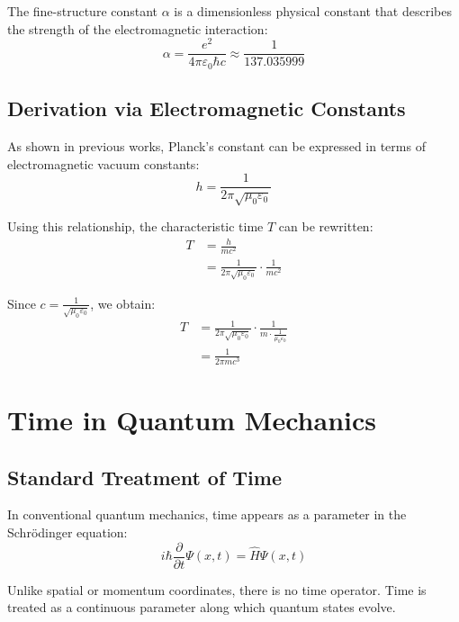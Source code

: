 \documentclass{article}
\begin{document}
	The fine-structure constant $\alpha$ is a dimensionless physical constant that describes the strength of the electromagnetic interaction:
	\begin{equation}
		\alpha = \frac{e^2}{4\pi\varepsilon_0\hbar c} \approx \frac{1}{137.035999}
	\end{equation}
	
	\subsection{Derivation via Electromagnetic Constants}
	
	As shown in previous works, Planck's constant can be expressed in terms of electromagnetic vacuum constants:
	\begin{equation}
		h = \frac{1}{2\pi\sqrt{\mu_0\varepsilon_0}}
	\end{equation}
	
	Using this relationship, the characteristic time $T$ can be rewritten:
	\begin{align}
		T &= \frac{h}{mc^2} \\
		&= \frac{1}{2\pi\sqrt{\mu_0\varepsilon_0}} \cdot \frac{1}{mc^2}
	\end{align}
	
	Since $c = \frac{1}{\sqrt{\mu_0\varepsilon_0}}$, we obtain:
	\begin{align}
		T &= \frac{1}{2\pi\sqrt{\mu_0\varepsilon_0}} \cdot \frac{1}{m \cdot \frac{1}{\mu_0\varepsilon_0}} \\
		&= \frac{1}{2\pi m c^3}
	\end{align}
	
	\section{Time in Quantum Mechanics}
	
	\subsection{Standard Treatment of Time}
	
	In conventional quantum mechanics, time appears as a parameter in the Schrödinger equation:
	\begin{equation}
		i\hbar \frac{\partial}{\partial t}\Psi(x,t) = \hat{H}\Psi(x,t)
	\end{equation}
	
	Unlike spatial or momentum coordinates, there is no time operator. Time is treated as a continuous parameter along which quantum states evolve.
	
\end{document}
